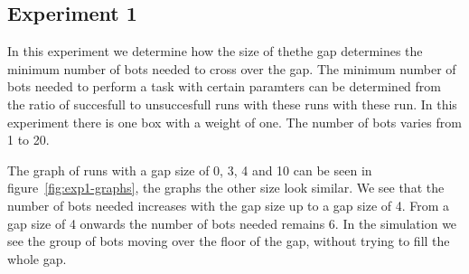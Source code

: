 \subsection{Experiment 1}
\label{ssec:exp1}

In this experiment we determine how the size of thethe gap determines the minimum number of
bots needed to cross over the gap. The minimum number of bots needed to perform
a task with certain paramters can be determined from the ratio of succesfull to
unsuccesfull runs with these runs with these run. In this experiment there is
one box with a weight of one. The number of bots varies from 1 to 20.

The graph of runs with a gap size of 0, 3, 4 and 10 can be seen in
figure~\ref{fig:exp1-graphs}, the graphs the other size look similar. We see
that the number of bots needed increases with the gap size up to a gap size of
4. From a gap size of 4 onwards the number of bots needed remains 6. In the
simulation we see the group of bots moving over the floor of the gap, without
trying to fill the whole gap.


